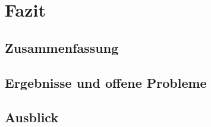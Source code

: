 \chapter{Fazit}
\label{fazit}

\section{Zusammenfassung}

\section{Ergebnisse und offene Probleme}

\section{Ausblick}
